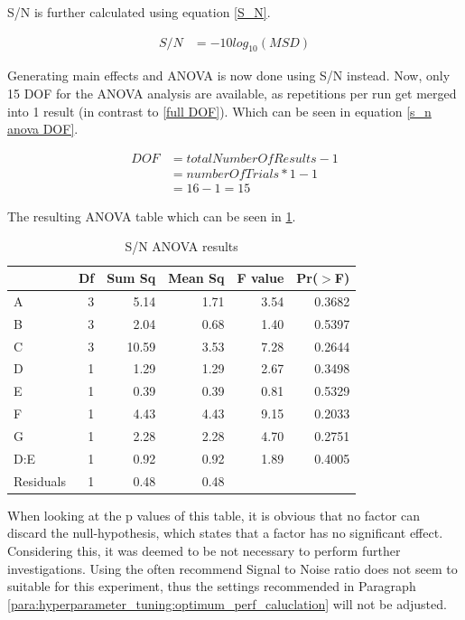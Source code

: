 S/N is further calculated using equation \ref{S_N}.

\begin{equation} \label{S_N}
	\begin{split}
		S/N & = -10 log_{10} (MSD)
	\end{split}
\end{equation}

Generating main effects and ANOVA is now done using S/N instead.
Now, only 15 DOF for the ANOVA analysis are available, as repetitions per run get merged into 1 result (in contrast to \ref{full DOF}). Which can be seen in equation \ref{s_n anova DOF}.

\begin{equation} \label{s_n anova DOF}
	\begin{split}
		DOF & = totalNumberOfResults - 1 \\
		& = numberOfTrials * 1 - 1 \\
		& = 16 - 1 = 15
	\end{split}
\end{equation}

The resulting ANOVA table which can be seen in \ref{table:taguchi:s_n_anova_results}.

\begin{table}[ht]
	\centering
	\begin{tabular}{lrrrrr}
		\hline
		& Df & Sum Sq & Mean Sq & F value & Pr($>$F) \\ 
		\hline
		A & 3 & 5.14 & 1.71 & 3.54 & 0.3682 \\ 
		B & 3 & 2.04 & 0.68 & 1.40 & 0.5397 \\ 
		C & 3 & 10.59 & 3.53 & 7.28 & 0.2644 \\ 
		D & 1 & 1.29 & 1.29 & 2.67 & 0.3498 \\ 
		E & 1 & 0.39 & 0.39 & 0.81 & 0.5329 \\ 
		F & 1 & 4.43 & 4.43 & 9.15 & 0.2033 \\ 
		G & 1 & 2.28 & 2.28 & 4.70 & 0.2751 \\ 
		D:E & 1 & 0.92 & 0.92 & 1.89 & 0.4005 \\ 
		Residuals & 1 & 0.48 & 0.48 &  &  \\ 
		\hline
	\end{tabular}
		\caption{S/N ANOVA results}
	\label{table:taguchi:s_n_anova_results}
\end{table}

When looking at the p values of this table, it is obvious that no factor can discard the null-hypothesis, which states that a factor has no significant effect. Considering this, it was deemed to be not necessary to perform further investigations. Using the often recommend Signal to Noise ratio does not seem to suitable for this experiment, thus the settings recommended in Paragraph \ref{para:hyperparameter_tuning:optimum_perf_caluclation} will not be adjusted.

